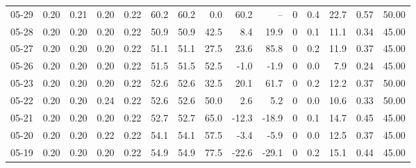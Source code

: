 \begin{threeparttable}
{\begin{tabular}{lrrrrrrrrrrrrrr}
  05-29 &          0.20 &          0.21 &          0.20 &        0.22 &                60.2 &               60.2 &                 0.0 &       60.2 &           -- &              0 &                 0.4 &             22.7 &            0.57 &                  50.00 \\
  05-28 &          0.20 &          0.20 &          0.20 &        0.22 &                50.9 &               50.9 &                42.5 &        8.4 &         19.9 &              0 &                 0.1 &             11.1 &            0.34 &                  45.00 \\
  05-27 &          0.20 &          0.20 &          0.20 &        0.22 &                51.1 &               51.1 &                27.5 &       23.6 &         85.8 &              0 &                 0.2 &             11.9 &            0.37 &                  45.00 \\
  05-26 &          0.20 &          0.20 &          0.20 &        0.22 &                51.5 &               51.5 &                52.5 &       -1.0 &         -1.9 &              0 &                 0.0 &              7.9 &            0.24 &                  45.00 \\
  05-23 &          0.20 &          0.20 &          0.20 &        0.22 &                52.6 &               52.6 &                32.5 &       20.1 &         61.7 &              0 &                 0.2 &             12.2 &            0.37 &                  50.00 \\
  05-22 &          0.20 &          0.20 &          0.24 &        0.22 &                52.6 &               52.6 &                50.0 &        2.6 &          5.2 &              0 &                 0.0 &             10.6 &            0.33 &                  50.00 \\
  05-21 &          0.20 &          0.20 &          0.20 &        0.22 &                52.7 &               52.7 &                65.0 &      -12.3 &        -18.9 &              0 &                 0.1 &             14.7 &            0.45 &                  45.00 \\
  05-20 &          0.20 &          0.20 &          0.22 &        0.22 &                54.1 &               54.1 &                57.5 &       -3.4 &         -5.9 &              0 &                 0.0 &             12.5 &            0.37 &                  45.00 \\
  05-19 &          0.20 &          0.20 &          0.20 &        0.22 &                54.9 &               54.9 &                77.5 &      -22.6 &        -29.1 &              0 &                 0.2 &             15.1 &            0.44 &                  45.00 \\

\end{tabular}}
\end{threeparttable}
